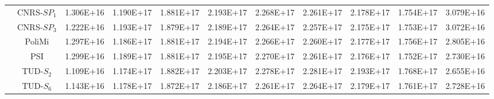 \begin{table}[htbp!]
\begin{tabular}{c c c c c c c c c c c}
		& CNRS-$SP_1$ & 1.306E+16 & 1.190E+17 & 1.881E+17 & 2.193E+17 & 2.268E+17 & 2.261E+17 & 2.178E+17 & 1.754E+17 & 3.079E+16 \\
		& CNRS-$SP_3$ & 1.222E+16 & 1.193E+17 & 1.879E+17 & 2.189E+17 & 2.264E+17 & 2.257E+17 & 2.175E+17 & 1.753E+17 & 3.072E+16 \\
		& PoliMi & 1.297E+16 & 1.186E+17 & 1.881E+17 & 2.194E+17 & 2.266E+17 & 2.260E+17 & 2.177E+17 & 1.756E+17 & 2.805E+16 \\
		& PSI & 1.299E+16 & 1.189E+17 & 1.881E+17 & 2.195E+17 & 2.270E+17 & 2.261E+17 & 2.176E+17 & 1.752E+17 & 2.730E+16 \\
		& TUD-$S_2$ & 1.109E+16 & 1.174E+17 & 1.882E+17 & 2.203E+17 & 2.278E+17 & 2.281E+17 & 2.193E+17 & 1.768E+17 & 2.655E+16 \\
		& TUD-$S_6$ & 1.143E+16 & 1.178E+17 & 1.872E+17 & 2.186E+17 & 2.261E+17 & 2.264E+17 & 2.179E+17 & 1.761E+17 & 2.728E+16 \\
		\bottomrule
	\end{tabular}
\end{table}

